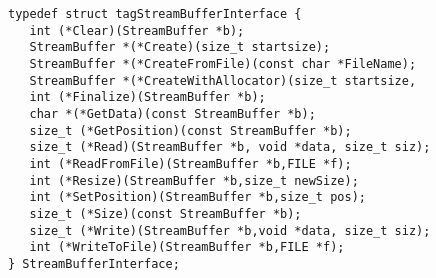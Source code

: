 \begin{verbatim}
typedef struct tagStreamBufferInterface {
   int (*Clear)(StreamBuffer *b);
   StreamBuffer *(*Create)(size_t startsize);
   StreamBuffer *(*CreateFromFile)(const char *FileName);
   StreamBuffer *(*CreateWithAllocator)(size_t startsize,
   int (*Finalize)(StreamBuffer *b);
   char *(*GetData)(const StreamBuffer *b);
   size_t (*GetPosition)(const StreamBuffer *b);
   size_t (*Read)(StreamBuffer *b, void *data, size_t siz);
   int (*ReadFromFile)(StreamBuffer *b,FILE *f);
   int (*Resize)(StreamBuffer *b,size_t newSize);
   int (*SetPosition)(StreamBuffer *b,size_t pos);
   size_t (*Size)(const StreamBuffer *b);
   size_t (*Write)(StreamBuffer *b,void *data, size_t siz);
   int (*WriteToFile)(StreamBuffer *b,FILE *f);
} StreamBufferInterface;
\end{verbatim}
